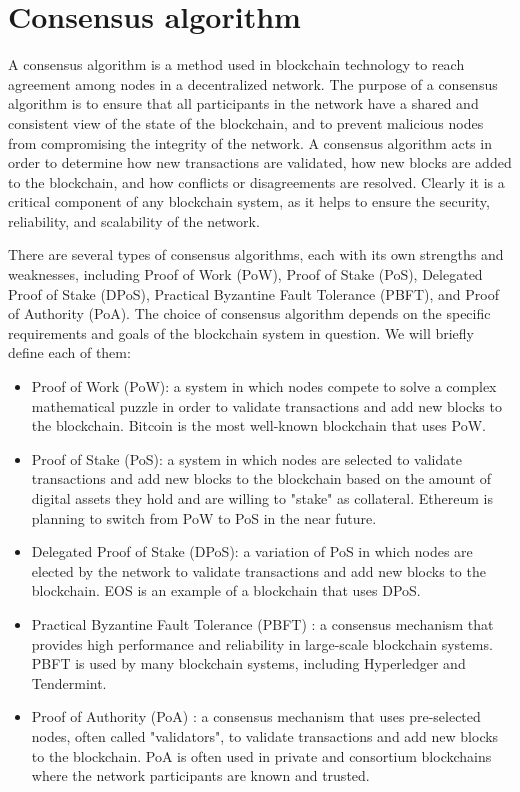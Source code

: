 \documentclass[target=mst,aauheader=]{thud}
\begin{document}
    \section{Consensus algorithm}
    
    A consensus algorithm is a method used in blockchain technology to reach agreement among nodes in a decentralized network. The purpose of a consensus algorithm is to ensure that all participants in the network have a shared and consistent view of the state of the blockchain, and to prevent malicious nodes from compromising the integrity of the network.
    A consensus algorithm acts in order to determine how new transactions are validated, how new blocks are added to the blockchain, and how conflicts or disagreements are resolved. Clearly it is a critical component of any blockchain system, as it helps to ensure the security, reliability, and scalability of the network.
    
    There are several types of consensus algorithms, each with its own strengths and weaknesses, including Proof of Work (PoW), Proof of Stake (PoS), Delegated Proof of Stake (DPoS), Practical Byzantine Fault Tolerance (PBFT), and Proof of Authority (PoA). The choice of consensus algorithm depends on the specific requirements and goals of the blockchain system in question. 
    We will briefly define each of them:
    
    \begin{itemize}    

        \item Proof of Work (PoW): a system in which nodes compete to solve a complex mathematical puzzle in order to validate transactions and add new blocks to the blockchain. Bitcoin \cite{nakamoto2008bitcoin} is the most well-known blockchain that uses PoW.
        \item Proof of Stake (PoS): a system in which nodes are selected to validate transactions and add new blocks to the blockchain based on the amount of digital assets they hold and are willing to "stake" as collateral. Ethereum \cite{buterin2014next} is planning to switch from PoW to PoS in the near future.
        \item Delegated Proof of Stake (DPoS): a variation of PoS in which nodes are elected by the network to validate transactions and add new blocks to the blockchain. EOS \cite{xu2018eos} is an example of a blockchain that uses DPoS.
        \item Practical Byzantine Fault Tolerance (PBFT) \cite{byzantineConsensus}: a consensus mechanism that provides high performance and reliability in large-scale blockchain systems. PBFT is used by many blockchain systems, including Hyperledger and Tendermint.
        \item Proof of Authority (PoA) \cite{poaFeasibility}: a consensus mechanism that uses pre-selected nodes, often called "validators", to validate transactions and add new blocks to the blockchain. PoA is often used in private and consortium blockchains where the network participants are known and trusted.

    \end{itemize}
\end{document}
